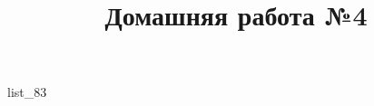 \documentclass[12pt, a4paper]{article}
\begin{document}
	\title{Домашняя работа №4}
	{list_83}
\end{document}
